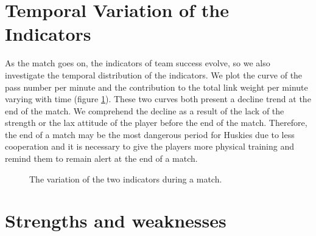 \documentclass[12pt]{article}
\begin{document}
\section{Temporal Variation of the Indicators}
As the match goes on, the indicators of team success evolve, so we also investigate the temporal distribution of the indicators. We plot the curve of the pass number per minute and the contribution to the total link weight per minute varying with time (figure \ref{variation}). These two curves both present a decline trend at the end of the match. We comprehend the decline as a result of the lack of the strength or the lax attitude of the player before the end of the match. Therefore, the end of a match may be the most dangerous period for Huskies due to less cooperation and it is necessary to give the players more physical training and remind them to remain alert at the end of a match.
\begin{figure}[h]
	\centering
	\caption{The variation of the two indicators during a match.}
	\label{variation}
\end{figure}

\section{Strengths and weaknesses}
\end{document}
